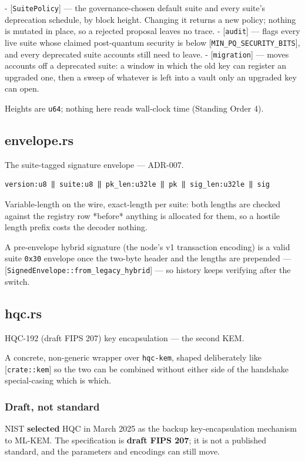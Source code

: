 \documentclass[11pt,a4paper]{article}
\begin{document}
- [\texttt{SuitePolicy}] — the governance-chosen default suite and every suite's
  deprecation schedule, by block height. Changing it returns a new policy;
  nothing is mutated in place, so a rejected proposal leaves no trace.
- [\texttt{audit}] — flags every live suite whose claimed post-quantum security
  is below [\texttt{MIN\_PQ\_SECURITY\_BITS}], and every deprecated suite accounts
  still need to leave.
- [\texttt{migration}] — moves accounts off a deprecated suite: a window in which
  the old key can register an upgraded one, then a sweep of whatever is
  left into a vault only an upgraded key can open.

Heights are \texttt{u64}; nothing here reads wall-clock time (Standing Order 4).

\subsection{envelope.rs}
The suite-tagged signature envelope — ADR-007.

\begin{verbatim}
version:u8 ‖ suite:u8 ‖ pk_len:u32le ‖ pk ‖ sig_len:u32le ‖ sig
\end{verbatim}

Variable-length on the wire, exact-length per suite: both lengths are
checked against the registry row *before* anything is allocated for them,
so a hostile length prefix costs the decoder nothing.

A pre-envelope hybrid signature (the node's v1 transaction encoding) is a
valid suite \texttt{0x30} envelope once the two-byte header and the lengths are
prepended — [\texttt{SignedEnvelope::from\_legacy\_hybrid}] — so history keeps
verifying after the switch.

\subsection{hqc.rs}
HQC-192 (draft FIPS 207) key encapsulation — the second KEM.

A concrete, non-generic wrapper over \texttt{hqc-kem}, shaped deliberately like
[\texttt{crate::kem}] so the two can be combined without either side of the
handshake special-casing which is which.

\subsubsection{Draft, not standard}

NIST \textbf{selected} HQC in March 2025 as the backup key-encapsulation
mechanism to ML-KEM. The specification is \textbf{draft FIPS 207}; it is not a
published standard, and the parameters and encodings can still move.
\end{document}

